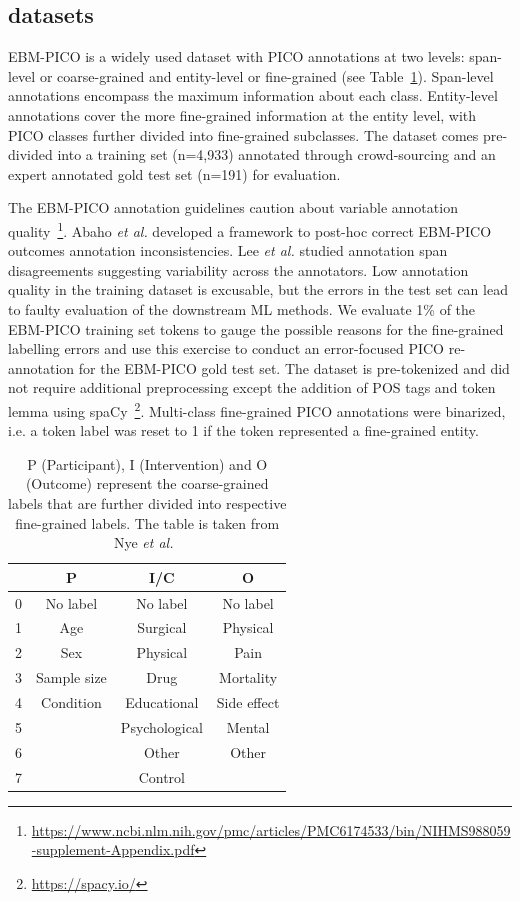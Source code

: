 \documentclass[10.7pt,]{article}
\begin{document}
\subsection{datasets}\label{data}
%
EBM-PICO is a widely used dataset with PICO annotations at two levels: span-level or coarse-grained and entity-level or fine-grained (see Table~\ref{tab:coarsefineconcept}).
Span-level annotations encompass the maximum information about each class.
Entity-level annotations cover the more fine-grained information at the entity level, with PICO classes further divided into fine-grained subclasses.
The dataset comes pre-divided into a training set (n=4,933) annotated through crowd-sourcing and an expert annotated gold test set (n=191) for evaluation.~\cite{nye2018corpus}

The EBM-PICO annotation guidelines caution about variable annotation quality~\footnote{\url{https://www.ncbi.nlm.nih.gov/pmc/articles/PMC6174533/bin/NIHMS988059-supplement-Appendix.pdf}}.
Abaho \textit{et al.} developed a framework to post-hoc correct EBM-PICO outcomes annotation inconsistencies\cite{abaho2019correcting}.
Lee \textit{et al.} studied annotation span disagreements suggesting variability across the annotators.\cite{lee2019study}
Low annotation quality in the training dataset is excusable, but the errors in the test set can lead to faulty evaluation of the downstream ML methods.
We evaluate 1\% of the EBM-PICO training set tokens to gauge the possible reasons for the fine-grained labelling errors and use this exercise to conduct an error-focused PICO re-annotation for the EBM-PICO gold test set.
The dataset is pre-tokenized and did not require additional preprocessing except the addition of POS tags and token lemma using spaCy~\footnote{\url{https://spacy.io/}}.
Multi-class fine-grained PICO annotations were binarized, i.e. a token label was reset to 1 if the token represented a fine-grained entity.
%
\begin{table}[h!]
\begin{center}
\begin{tabular}{| c | c | c | c |} 
\hline
 & P & I/C & O \\ 
\hline
0 & No label & No label & No label \\ 
1 & Age & Surgical & Physical \\ 
2 & Sex & Physical & Pain \\
3 & Sample size & Drug & Mortality \\
4 & Condition & Educational & Side effect \\
5 &  & Psychological & Mental \\
6 &  & Other & Other \\
7 &  & Control &  \\
\hline
\end{tabular}
\caption{\label{tab:coarsefineconcept} P (Participant), I (Intervention) and O (Outcome) represent the coarse-grained labels that are further divided into respective fine-grained labels. The table is taken from Nye \textit{et al.}~\cite{nye2018corpus}}
\end{center}
\end{table}
%
\end{document}
